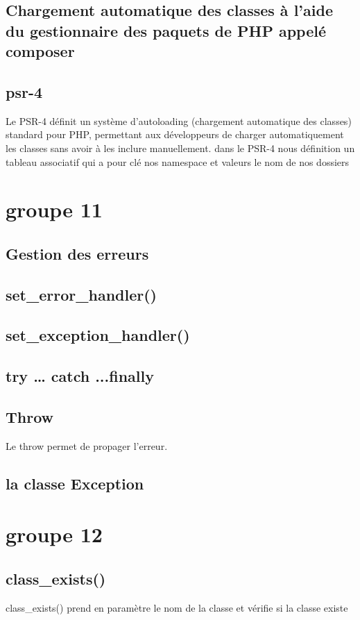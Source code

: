 \documentclass[12pt,b5paper]{article}
\begin{document}
\subsection{ Chargement automatique des classes à l’aide du gestionnaire des paquets de PHP appelé
composer}
\subsection{psr-4}
 Le PSR-4 définit un système d'autoloading (chargement automatique des classes) standard pour PHP, permettant aux développeurs de charger automatiquement les classes sans avoir à les inclure manuellement.
 dans le PSR-4 nous définition un tableau associatif qui a pour clé nos namespace et valeurs le nom de nos dossiers
 
 \section{groupe 11}
 \subsection{Gestion des erreurs}
\subsection{set\_error\_handler()} 
\subsection{set\_exception\_handler()} 
\subsection{try … catch ...finally}
\subsection{Throw}
Le throw permet de propager l'erreur.
\subsection{la classe Exception}
 
 
 \section{groupe 12}
 \subsection{ class\_exists()}
  class\_exists() prend en paramètre le nom de la classe et vérifie si la classe existe
\end{document}
